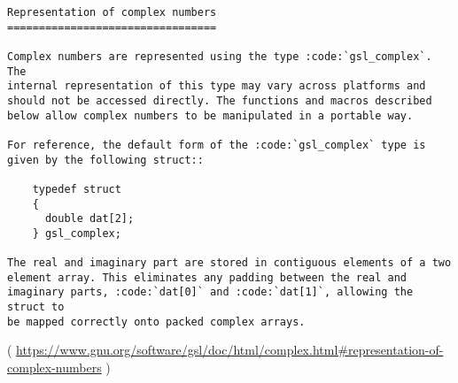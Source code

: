 \begin{lstlisting}
Representation of complex numbers
=================================

Complex numbers are represented using the type :code:`gsl_complex`. The
internal representation of this type may vary across platforms and
should not be accessed directly. The functions and macros described
below allow complex numbers to be manipulated in a portable way.

For reference, the default form of the :code:`gsl_complex` type is
given by the following struct::

    typedef struct
    {
      double dat[2];
    } gsl_complex;

The real and imaginary part are stored in contiguous elements of a two
element array. This eliminates any padding between the real and
imaginary parts, :code:`dat[0]` and :code:`dat[1]`, allowing the struct to
be mapped correctly onto packed complex arrays.
\end{lstlisting}
( \url{https://www.gnu.org/software/gsl/doc/html/complex.html#representation-of-complex-numbers} )
\fi


